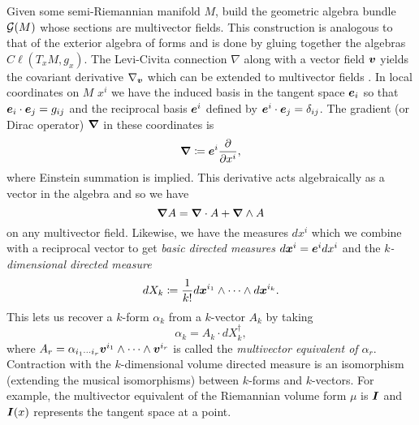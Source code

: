 \documentclass{article}
\begin{document}
Given some semi-Riemannian manifold $M$, build the geometric algebra bundle $\mathcal{G}(M)$ whose sections are multivector fields. This construction is analogous to that of the exterior algebra of forms and is done by gluing together the algebras $C\ell(T_xM,g_x)$.  The Levi-Civita connection $\nabla$ along with a vector field $\boldsymbol{v}$ yields the covariant derivative $\nabla_{\boldsymbol{v}}$ which can be extended to multivector fields \cite{schindler_geometric_2020}. In local coordinates on $M$ $x^i$ we have the induced basis in the tangent space $\boldsymbol{e}_i$ so that $\boldsymbol{e}_i\cdot \boldsymbol{e}_j = g_{ij}$ and the reciprocal basis $\boldsymbol{e}^i$ defined by $\boldsymbol{e}^i\cdot \boldsymbol{e}_j = \delta_{ij}$. The gradient (or Dirac operator) $\boldsymbol{\nabla}$ in these coordinates is
\begin{equation}
    \boldsymbol{\nabla} \coloneqq \boldsymbol{e}^i \frac{\partial}{\partial x^i},
\end{equation}
where Einstein summation is implied. This derivative acts algebraically as a vector in the algebra and so we have
\begin{equation}
\boldsymbol{\nabla} A = \boldsymbol{\nabla} \cdot A + \boldsymbol{\nabla} \wedge A
\end{equation}
on any multivector field. Likewise, we have the measures $dx^i$ which we combine with a reciprocal vector to get \emph{basic directed measures} $d\boldsymbol{x}^i = \boldsymbol{e}^i dx^i$ and the \emph{$k$-dimensional directed measure}
\begin{equation}
    dX_k \coloneqq \frac{1}{k!} d\boldsymbol{x}^{i_1}\wedge \cdots \wedge d\boldsymbol{x}^{i_k}.
\end{equation}
This lets us recover a $k$-form $\alpha_k$ from a $k$-vector $A_k$ by taking
\begin{equation}
\alpha_k = A_k \cdot dX_k^\dagger,
\end{equation}
where $A_r = \alpha_{i_1 \cdots i_r} \boldsymbol{v}^{i_1} \wedge \cdots \wedge \boldsymbol{v}^{i_r}$ is called the \emph{multivector equivalent of $\alpha_r$}. Contraction with the $k$-dimensional volume directed measure is an isomorphism (extending the musical isomorphisms) between $k$-forms and $k$-vectors. For example, the multivector equivalent of the Riemannian volume form $\mu$ is $\boldsymbol{I}$ and $\boldsymbol{I}(x)$ represents the tangent space at a point. 
\end{document}
